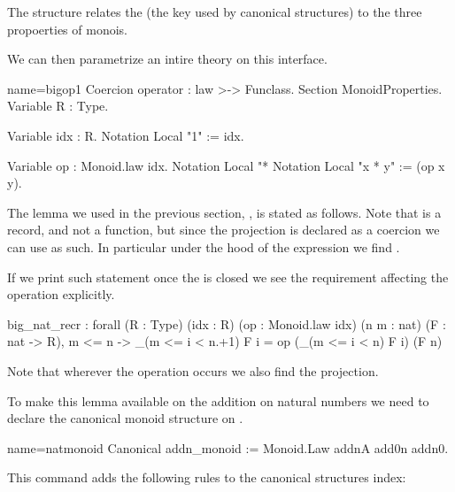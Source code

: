 The  structure relates the  (the key used by
canonical structures) to the three propoerties of monois.

We can then parametrize an intire theory on this interface.

\begin{coq}{name=bigop1}{}
Coercion operator : law >-> Funclass.
Section MonoidProperties.
Variable R : Type.

Variable idx : R.
Notation Local "1" := idx.

Variable op : Monoid.law idx.
Notation Local "*%
Notation Local "x * y" := (op x y).
\end{coq}

The lemma we used in the previous section, , is
stated as follows. Note that
 is a record, and not a function, but since the 
projection is declared as a coercion we can use  as such.
In particular under the hood of the expression \C{\\big[*\%M/1]} we
find .


_(m <= i < n.+1) F i =
    op (\big[op/idx]_(m <= i < n) F i) (F n)
\end{coqout}

Note that wherever the operation  occurs we also find
the  projection.

To make this lemma available on the addition on natural numbers
we need to declare the canonical monoid structure on .

\begin{coq}{name=natmonoid}{}
Canonical addn_monoid := Monoid.Law addnA add0n addn0.
\end{coq}

This command adds the following rules to the canonical structures
index:

